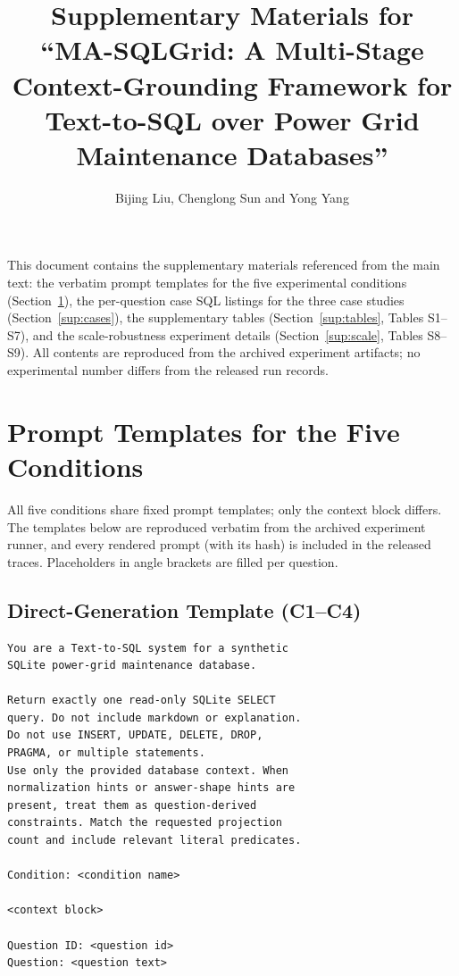 \documentclass[11pt]{article}
\title{Supplementary Materials for\\``MA-SQLGrid: A Multi-Stage Context-Grounding Framework for Text-to-SQL over Power Grid Maintenance Databases''}
\author{Bijing Liu, Chenglong Sun and Yong Yang}
\date{}
\begin{document}
\maketitle

\noindent This document contains the supplementary materials referenced from the main text: the verbatim prompt templates for the five experimental conditions (Section~\ref{sup:prompts}), the per-question case SQL listings for the three case studies (Section~\ref{sup:cases}), the supplementary tables (Section~\ref{sup:tables}, Tables S1--S7), and the scale-robustness experiment details (Section~\ref{sup:scale}, Tables S8--S9). All contents are reproduced from the archived experiment artifacts; no experimental number differs from the released run records.

\section{Prompt Templates for the Five Conditions}\label{sup:prompts}

All five conditions share fixed prompt templates; only the context block differs. The templates below are reproduced verbatim from the archived experiment runner, and every rendered prompt (with its hash) is included in the released traces. Placeholders in angle brackets are filled per question.

\subsection{Direct-Generation Template (C1--C4)}

\begin{small}
\begin{verbatim}
You are a Text-to-SQL system for a synthetic
SQLite power-grid maintenance database.

Return exactly one read-only SQLite SELECT
query. Do not include markdown or explanation.
Do not use INSERT, UPDATE, DELETE, DROP,
PRAGMA, or multiple statements.
Use only the provided database context. When
normalization hints or answer-shape hints are
present, treat them as question-derived
constraints. Match the requested projection
count and include relevant literal predicates.

Condition: <condition name>

<context block>

Question ID: <question id>
Question: <question text>
\end{verbatim}
\end{small}
\end{document}
